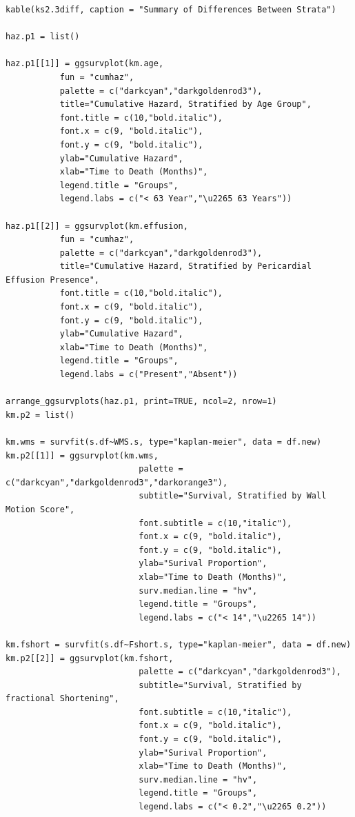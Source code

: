 \documentclass[
]{article}
\begin{document}
\begin{verbatim}
kable(ks2.3diff, caption = "Summary of Differences Between Strata")

haz.p1 = list()

haz.p1[[1]] = ggsurvplot(km.age, 
           fun = "cumhaz",
           palette = c("darkcyan","darkgoldenrod3"), 
           title="Cumulative Hazard, Stratified by Age Group",
           font.title = c(10,"bold.italic"),
           font.x = c(9, "bold.italic"),
           font.y = c(9, "bold.italic"),
           ylab="Cumulative Hazard", 
           xlab="Time to Death (Months)",
           legend.title = "Groups",
           legend.labs = c("< 63 Year","\u2265 63 Years"))

haz.p1[[2]] = ggsurvplot(km.effusion, 
           fun = "cumhaz",
           palette = c("darkcyan","darkgoldenrod3"), 
           title="Cumulative Hazard, Stratified by Pericardial Effusion Presence",
           font.title = c(10,"bold.italic"),
           font.x = c(9, "bold.italic"),
           font.y = c(9, "bold.italic"),
           ylab="Cumulative Hazard", 
           xlab="Time to Death (Months)",
           legend.title = "Groups",
           legend.labs = c("Present","Absent"))

arrange_ggsurvplots(haz.p1, print=TRUE, ncol=2, nrow=1)
km.p2 = list()

km.wms = survfit(s.df~WMS.s, type="kaplan-meier", data = df.new)
km.p2[[1]] = ggsurvplot(km.wms, 
                           palette = c("darkcyan","darkgoldenrod3","darkorange3"), 
                           subtitle="Survival, Stratified by Wall Motion Score",
                           font.subtitle = c(10,"italic"),
                           font.x = c(9, "bold.italic"),
                           font.y = c(9, "bold.italic"),
                           ylab="Surival Proportion", 
                           xlab="Time to Death (Months)",
                           surv.median.line = "hv",
                           legend.title = "Groups",
                           legend.labs = c("< 14","\u2265 14"))

km.fshort = survfit(s.df~Fshort.s, type="kaplan-meier", data = df.new)
km.p2[[2]] = ggsurvplot(km.fshort, 
                           palette = c("darkcyan","darkgoldenrod3"), 
                           subtitle="Survival, Stratified by fractional Shortening",
                           font.subtitle = c(10,"italic"),
                           font.x = c(9, "bold.italic"),
                           font.y = c(9, "bold.italic"),
                           ylab="Surival Proportion", 
                           xlab="Time to Death (Months)",
                           surv.median.line = "hv",
                           legend.title = "Groups",
                           legend.labs = c("< 0.2","\u2265 0.2"))


\end{verbatim}
\end{document}
